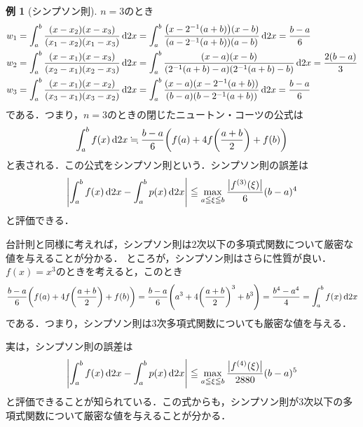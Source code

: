 \documentclass[a4paper]{ltjsarticle}
\theoremstyle{definition}
\newtheorem{example}{例}[section]
\DeclarePairedDelimiter{\abs}{\lvert}{\rvert}
\DeclarePairedDelimiter{\pqty}{\lparen}{\rparen}
\newcommand{\dd}[1]{\dl2#1}
\begin{document}
\begin{example}[シンプソン則]
  $n=3$のとき
  \begin{align*}
    w_1
    &= \int_a^b \frac{(x-x_2)(x-x_3)}{(x_1-x_2)(x_1-x_3)} \dd{x}
     = \int_a^b \frac{\pqty*{x-2^{-1}(a+b)}(x-b)}{\pqty*{a-2^{-1}(a+b)}(a-b)} \dd{x}
     = \frac{b-a}{6} \\
    w_2
    &= \int_a^b \frac{(x-x_1)(x-x_3)}{(x_2-x_1)(x_2-x_3)} \dd{x}
     = \int_a^b \frac{(x-a)(x-b)}{\pqty*{2^{-1}(a+b)-a}\pqty*{2^{-1}(a+b)-b}} \dd{x}
     = \frac{2(b-a)}{3} \\
    w_3
    &= \int_a^b \frac{(x-x_1)(x-x_2)}{(x_3-x_1)(x_3-x_2)} \dd{x}
     = \int_a^b \frac{(x-a)(x-2^{-1}(a+b))}{(b-a)(b-2^{-1}(a+b))} \dd{x}
     = \frac{b-a}{6}
  \end{align*}
  である．つまり，$n=3$のときの閉じたニュートン・コーツの公式は
  \[
    \int_a^b f(x) \dd{x} \fallingdotseq \frac{b-a}{6}\pqty*{f(a) + 4f\pqty*{\frac{a+b}{2}} + f(b)}
  \]
  と表される．この公式をシンプソン則という．シンプソン則の誤差は
  \[
    \abs*{\int_a^b f(x) \dd{x} - \int_a^b p(x) \dd{x}}
    \leqq \max_{a\leqq\xi\leqq b} \frac{\abs*{f^{(3)}(\xi)}}{6} (b-a)^4
  \]
  と評価できる．

  台計則と同様に考えれば，シンプソン則は$2$次以下の多項式関数について厳密な値を与えることが分かる．
  ところが，シンプソン則はさらに性質が良い．$f(x)=x^3$のときを考えると，このとき
  \[
    \frac{b-a}{6}\pqty*{f(a) + 4f\pqty*{\frac{a+b}{2}} + f(b)}
    = \frac{b-a}{6}\pqty*{a^3 + 4\pqty*{\frac{a+b}{2}}^3 + b^3}
    = \frac{b^4-a^4}{4}
    = \int_a^b f(x) \dd{x}
  \]
  である．つまり，シンプソン則は$3$次多項式関数についても厳密な値を与える．

  実は，シンプソン則の誤差は
  \[
    \abs*{\int_a^b f(x) \dd{x} - \int_a^b p(x) \dd{x}} \leqq \max_{a\leqq\xi\leqq b} \frac{\abs*{f^{(4)}(\xi)}}{2880} (b-a)^5
  \]
  と評価できることが知られている\cite{kikuchi}．この式からも，シンプソン則が$3$次以下の多項式関数について厳密な値を与えることが分かる．
\end{example}
\end{document}
